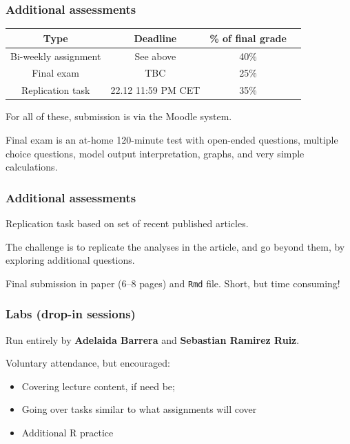 \documentclass[12pt,english,dvipsnames,aspectratio=169, handout]{beamer}
\begin{document}
\begin{frame}
	\frametitle{Additional assessments}
	
	\begin{table}
		\scriptsize
		\begin{tabular}{c c c c}
			\toprule
			\textbf{Type} & \textbf{Deadline} & \% of final grade \\
			\midrule
			Bi-weekly assignment & See above  & 40\% \\
			Final exam & TBC & 25\%  \\
			Replication task & 22.12 11:59 PM CET & 35\%  \\
			\bottomrule
		\end{tabular}
	\end{table}

For all of these, submission is via the Moodle system.\bigskip

Final exam is an at-home 120-minute test with open-ended questions, multiple choice questions, model output interpretation, graphs, and very simple calculations.
	
\end{frame}

\begin{frame}
	\frametitle{Additional assessments}
	Replication task based on set of recent published articles.\bigskip
	
	The challenge is to replicate the analyses in the article, and go beyond them, by exploring additional questions.\bigskip
	
	Final submission in paper (6--8 pages) and \texttt{Rmd} file. Short, but time consuming!
	
\end{frame}


\begin{frame}
	\frametitle{Labs (drop-in sessions)}
	Run entirely by \textbf{Adelaida Barrera} and \textbf{Sebastian Ramirez Ruiz}.\bigskip
	
	Voluntary attendance, but encouraged:
	
	\begin{itemize}
		\item Covering lecture content, if need be;
		\item Going over tasks similar to what assignments will cover
		\item Additional \textsf{R} practice
	\end{itemize}
	
\end{frame}
\end{document}
